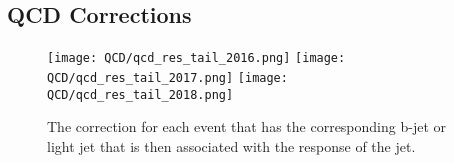 \subsection{QCD Corrections}


\begin{figure}
	\begin{center}
  \texttt{[image: QCD/qcd\_res\_tail\_2016.png]}
  \texttt{[image: QCD/qcd\_res\_tail\_2017.png]}
  \texttt{[image: QCD/qcd\_res\_tail\_2018.png]}
	\end{center}
	\caption[QCD Jet Response for each b-jet and light jet]{The correction for each event that has the corresponding b-jet or light jet that is then associated with the response of the jet. }
	\label{fig:qcd-cr-response-corr}
\end{figure}

